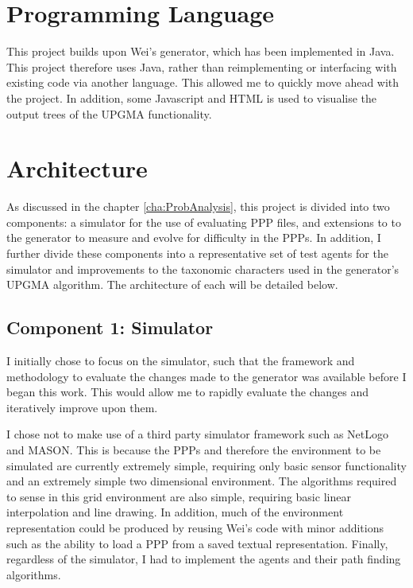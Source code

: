 \documentclass[authoryearcitations]{UoYCSproject}
\begin{document}
\section{Programming Language}
\label{sec:da_2}

This project builds upon Wei's generator, which has been implemented in Java. This project therefore uses Java, rather than reimplementing or interfacing with existing code via another language. This allowed me to quickly move ahead with the project. In addition, some Javascript and HTML is used to visualise the output trees of the UPGMA functionality.


\section{Architecture}
\label{sec:da_3}

As discussed in the chapter \ref{cha:ProbAnalysis}, this project is divided into two components: a simulator for the use of evaluating PPP files, and extensions to to the generator to measure and evolve for difficulty in the PPPs. In addition, I further divide these components into a representative set of test agents for the simulator and improvements to the taxonomic characters used in the generator's UPGMA algorithm. The architecture of each will be detailed below.

\subsection{Component 1: Simulator}
\label{sec:da_3_1}
I initially chose to focus on the simulator, such that the framework and methodology to evaluate the changes made to the generator was available before I began this work. This would allow me to rapidly evaluate the changes and iteratively improve upon them. 

I chose not to make use of a third party simulator framework such as NetLogo and MASON. This is because the PPPs and therefore the environment to be simulated are currently extremely simple, requiring only basic sensor functionality and an extremely simple two dimensional environment. The algorithms required to sense in this grid environment are also simple, requiring basic linear interpolation and line drawing. In addition, much of the environment representation could be produced by reusing Wei's code with minor additions such as the ability to load a PPP from a saved textual representation. Finally, regardless of the simulator, I had to implement the agents and their path finding algorithms.
\end{document}
